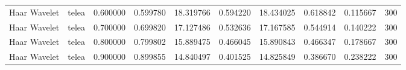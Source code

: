 \begin{table}[h]
\begin{tabular}{llrrrrrrrr}
Haar Wavelet & telea & 0.600000 & 0.599780 & 18.319766 & 0.594220 & 18.434025 & 0.618842 & 0.115667 & 300 \\
Haar Wavelet & telea & 0.700000 & 0.699820 & 17.127486 & 0.532636 & 17.167585 & 0.544914 & 0.140222 & 300 \\
Haar Wavelet & telea & 0.800000 & 0.799802 & 15.889475 & 0.466045 & 15.890843 & 0.466347 & 0.178667 & 300 \\
Haar Wavelet & telea & 0.900000 & 0.899855 & 14.840497 & 0.401525 & 14.825849 & 0.386670 & 0.238222 & 300 \\
\bottomrule
\end{tabular}


\end{table}
